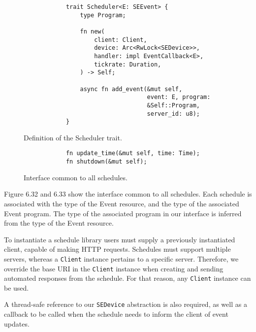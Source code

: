 \begin{figure}[h]
    \begin{center}
        \begin{lstlisting}
            trait Scheduler<E: SEEvent> {
                type Program;

                fn new(
                    client: Client,
                    device: Arc<RwLock<SEDevice>>,
                    handler: impl EventCallback<E>,
                    tickrate: Duration,
                ) -> Self;

                async fn add_event(&mut self, 
                                   event: E, program:
                                   &Self::Program, 
                                   server_id: u8);
            }
        \end{lstlisting}
        \label{fig:schedulertrait}
        \vspace{-10pt}
        \caption{Definition of the Scheduler trait.}
    \end{center}
\end{figure}

\begin{figure}[h]
    \begin{center}
        \begin{lstlisting}
            fn update_time(&mut self, time: Time);
            fn shutdown(&mut self);
        \end{lstlisting}
        \label{fig:schedulerimpl}
        \vspace{-10pt}
        \caption{Interface common to all schedules.}
    \end{center}
\end{figure}

Figure 6.32 and 6.33 show the interface common to all schedules. Each schedule is associated with the type of the Event resource, and the type of the associated Event program. The type of the associated program in our interface is inferred from the type of the Event resource.

To instantiate a schedule library users must supply a previously instantiated client, capable of making HTTP requests. Schedules must support multiple servers, whereas a \texttt{Client} instance pertains to a specific server. Therefore, we override the base URI in the \texttt{Client} instance when creating and sending automated responses from the schedule. For that reason, any \texttt{Client} instance can be used.

A thread-safe reference to our \texttt{SEDevice} abstraction is also required, as well as a callback to be called when the schedule needs to inform the client of event updates.


